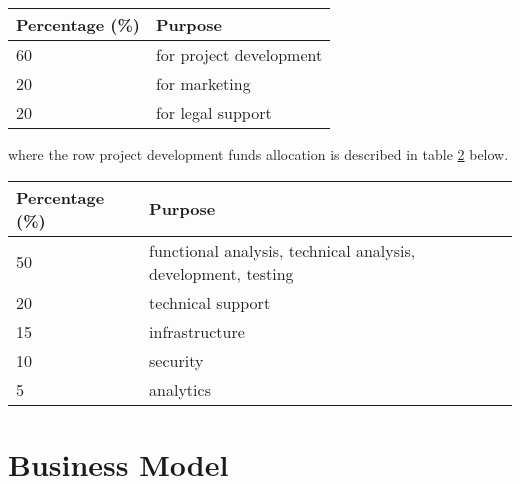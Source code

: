 \documentclass[11pt,fleqn,oneside]{book} %
\begin{document}
\vspace{5mm}
\label{fig:division}

\vspace{5mm}
\begin{table}[H]
	\centering
	\begin{tabular}{l l}
		\toprule
		\textbf{Percentage (\%)} & \textbf{Purpose} \\
		\midrule
		60		& for project development	\\
		20		& for marketing	\\
		20		& for legal support	\\
		\bottomrule
	\end{tabular}
	\label{tab:division}
\end{table}

\vspace{5mm}
where the row project development funds allocation is described in table \ref{tab:focus} below.

\vspace{5mm}
\begin{table}[H]
	\centering
	\begin{tabular}{l l}
		\toprule
		\textbf{Percentage (\%)} & \textbf{Purpose} \\
		\midrule
		50		& functional analysis, technical analysis, development, testing	\\
		20		& technical support	\\
		15		& infrastructure	\\
		10		& security	\\
		5		& analytics	\\
		\bottomrule
	\end{tabular}
	\label{tab:focus}
\end{table}



\chapter{Business Model}
\end{document}
